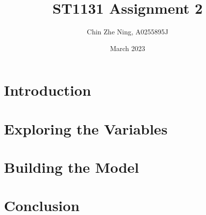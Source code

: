 \documentclass[12pt]{article}
\title{ST1131 Assignment 2}
\author{Chin Zhe Ning, A0255895J}
\date{March 2023}
\begin{document}
\maketitle

\section{Introduction}

\section{Exploring the Variables}

\section{Building the Model}

\section{Conclusion}
\end{document}
